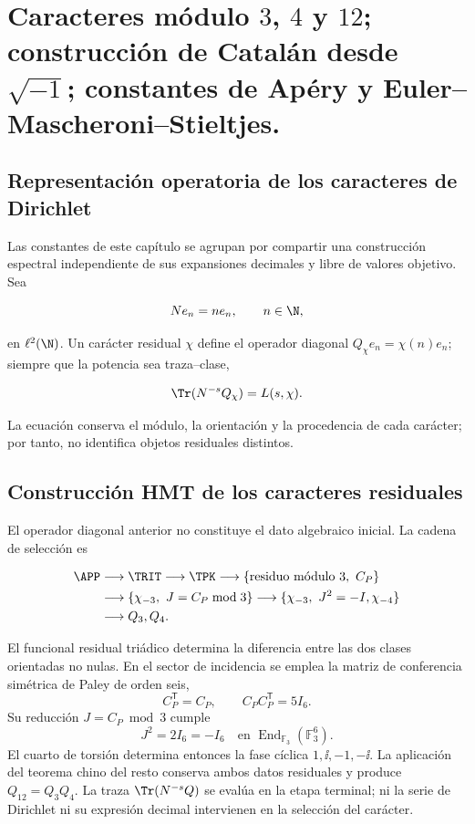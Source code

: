 \chapter{Caracteres módulo \texorpdfstring{\(3\)}{3}, \texorpdfstring{\(4\)}{4} y \texorpdfstring{\(12\)}{12}; construcción de Catalán desde \texorpdfstring{\(\sqrt{-1}\)}{√(-1)}; constantes de Apéry y Euler–Mascheroni–Stieltjes.}
\label{chap:p3-83-33-catalan_apery_euler}

\section{Representaci\'on operatoria de los caracteres de Dirichlet}

Las constantes de este cap\'itulo se agrupan por compartir una construcci\'on
espectral independiente de sus expansiones decimales y libre de valores
objetivo. Sea

\[
Ne_n=ne_n,\qquad n\in\N,
\]

en \(\ell^2(\N)\). Un car\'acter residual \(\chi\) define el operador diagonal \(Q_\chi e_n=\chi(n)e_n\); siempre que la potencia sea traza--clase,

\begin{equation}
\Tr(N^{-s}Q_\chi)=L(s,\chi).
\label{p3-83-c33-s1:eq:L-trace}
\end{equation}

La ecuaci\'on conserva el m\'odulo, la orientaci\'on y la procedencia de cada
car\'acter; por tanto, no identifica objetos residuales distintos.

\section{Construcci\'on HMT de los caracteres residuales}

El operador diagonal anterior no constituye el dato algebraico inicial. La
cadena de selecci\'on es

\[
\begin{aligned}
\APP&\longrightarrow\TRIT\longrightarrow\TPK
\longrightarrow\{\text{residuo m\'odulo }3,\ C_P\}\\
&\longrightarrow\{\chi_{-3},\ J=C_P\bmod3\}
\longrightarrow\{\chi_{-3},\ J^2=-I,\chi_{-4}\}\\
&\longrightarrow Q_3,Q_4.
\end{aligned}
\]

El funcional residual tri\'adico determina la diferencia entre las dos clases
orientadas no nulas. En el sector de incidencia se emplea la matriz de conferencia
sim\'etrica de Paley de orden seis,
\[
C_P^{\mathsf T}=C_P,\qquad C_PC_P^{\mathsf T}=5I_6.
\]
Su reducci\'on \(J=C_P\bmod3\) cumple
\[
J^2=2I_6=-I_6
\quad\text{en }\operatorname{End}_{\mathbb F_3}(\mathbb F_3^6).
\]
El cuarto de torsi\'on determina entonces la fase c\'iclica
\(1,\ii,-1,-\ii\). La aplicaci\'on del teorema chino del resto conserva
ambos datos residuales y produce \(Q_{12}=Q_3Q_4\). La traza
\(\Tr(N^{-s}Q)\) se eval\'ua en la etapa terminal; ni la serie de Dirichlet
ni su expresi\'on decimal intervienen en la selecci\'on del car\'acter.


